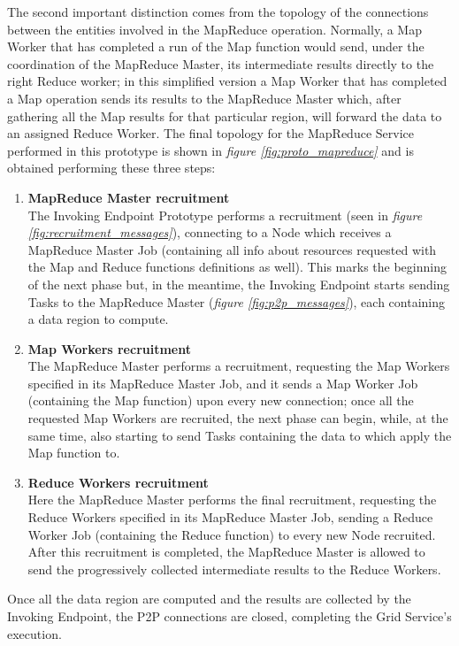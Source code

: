 The second important distinction comes from the topology of the connections between the entities involved in the MapReduce operation. Normally, a Map Worker that has completed a run of the Map function would send, under the coordination of the MapReduce Master, its intermediate results directly to the right Reduce worker; in this simplified version a Map Worker that has completed a Map operation sends its results to the MapReduce Master which, after gathering all the Map results for that particular region, will forward the data to an assigned Reduce Worker. The final topology for the MapReduce Service performed in this prototype is shown in \textit{figure \ref{fig:proto_mapreduce}} and is obtained performing these three steps:
\begin{enumerate}
    \item \textbf{MapReduce Master recruitment}\\
    The Invoking Endpoint Prototype performs a recruitment (seen in \textit{figure \ref{fig:recruitment_messages}}), connecting to a Node which receives a MapReduce Master Job (containing all info about resources requested with the Map and Reduce functions definitions as well). This marks the beginning of the next phase but, in the meantime, the Invoking Endpoint starts sending Tasks to the MapReduce Master (\textit{figure \ref{fig:p2p_messages}}), each containing a data region to compute.
    \item \textbf{Map Workers recruitment}\\
    The MapReduce Master performs a recruitment, requesting the Map Workers specified in its MapReduce Master Job, and it sends a Map Worker Job (containing the Map function) upon every new connection; once all the requested Map Workers are recruited, the next phase can begin, while, at the same time, also starting to send Tasks containing the data to which apply the Map function to.
    \item \textbf{Reduce Workers recruitment}\\
    Here the MapReduce Master performs the final recruitment, requesting the Reduce Workers specified in its MapReduce Master Job, sending a Reduce Worker Job (containing the Reduce function) to every new Node recruited. After this recruitment is completed, the MapReduce Master is allowed to send the progressively collected intermediate results to the Reduce Workers. 
\end{enumerate}

Once all the data region are computed and the results are collected by the Invoking Endpoint, the P2P connections are closed, completing the Grid Service's execution.

